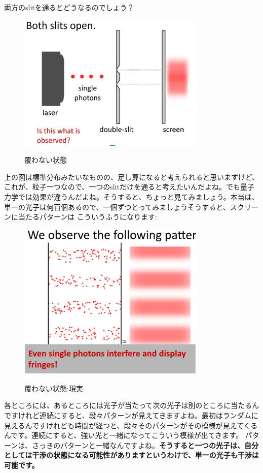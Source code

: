両方のslitを通るとどうなるのでしょう？
\begin{figure}[H]
   \centering
    \includegraphics[width=0.8\textwidth]{lesson6/block_neither.pdf}
    \label{fig: 1}
    \begin{center}
        \caption{覆わない状態}
    \end{center}
\end{figure}
上の図は標準分布みたいなものの、足し算になると考えられると思いますけど、
これが、粒子一つなので、一つのslitだけを通ると考えたいんだよね。でも量子力学では効果が違うんだよね。そうすると、ちょっと見てみましょう。本当は、単一の光子は何百個あるので、一個ずつとってみましょうそうすると、スクリーンに当たるパターンは
こういうふうになります:
\begin{figure}[H]
   \centering
    \includegraphics[width=0.8\textwidth]{lesson6/block_neither_reality.pdf}
    \label{fig: 1}
    \begin{center}
        \caption{覆わない状態:現実}
    \end{center}
\end{figure}
各ところには、あるところには光子が当たって次の光子は別のところに当たるんですけれど連続にすると、段々パターンが見えてきますよね。最初はランダムに見えるんですけれども時間が経つと、段々そのパターンがその模様が見えてくるんです。連続にすると、強い光と一緒になってこういう模様が出てきます。
パターンは、さっきのパターンと一緒なんですよね。\textbf{そうすると一つの光子は、自分としては干渉の状態になる可能性がありますというわけで、単一の光子も干渉は可能です。}



